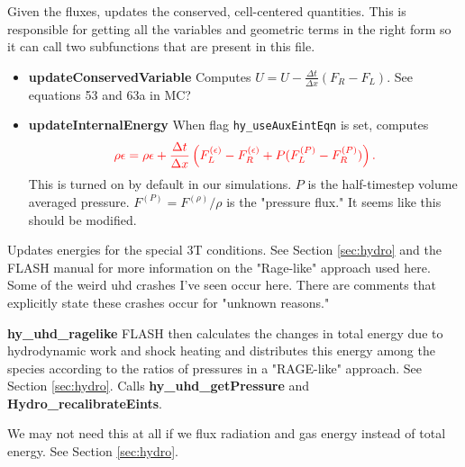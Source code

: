\documentclass[preprint,11pt]{aastex}
\newcommand{\beq}{\begin{equation}}
\newcommand{\eeq}{\end{equation}}
\begin{document}
\begin{description}
\begin{description}
\begin{itemize}
\begin{enumerate}
			\end{enumerate}
		\end{itemize}
		\item[unsplitUpdate] Given the fluxes, updates the conserved, cell-centered quantities.  This is responsible for getting all the variables and geometric terms in the right form so it can call two subfunctions that are present in this file.
		\begin{itemize}
			\item \textbf{updateConservedVariable} Computes $U = U-\frac{\Delta t}{\Delta x}\left( F_R - F_L \right)$.  See equations 53 and 63a in MC?
			\item \textbf{updateInternalEnergy} When flag \verb!hy_useAuxEintEqn! is set, computes 
			\beq
			{\color{red}
			\rho \epsilon = \rho \epsilon + \frac{\Delta t}{\Delta x} \left( F_L^{(\epsilon)} - F_R^{(\epsilon)} + P (F_{L}^{(P)} - F_{R}^{(P)}) \right).  
			}
			\eeq
			This is turned on by default in our simulations.  $P$ is the half-timestep volume averaged pressure.  $F^{(P)} = F^{(\rho)}/\rho$ is the "pressure flux." {\color{blue} It seems like this should be modified.}  
		\end{itemize}
		{\color{red}\item[multiTemp/unsplitUpdateMultiTemp] Updates energies for the special 3T conditions.  See Section \ref{sec:hydro} and the FLASH manual for more information on the "Rage-like" approach used here.  Some of the weird uhd crashes I've seen occur here.  There are comments that explicitly state these crashes occur for "unknown reasons."}
		\begin{itemize}
			{\color{red} \item \textbf{hy\_uhd\_ragelike} FLASH then calculates the changes in total energy due to hydrodynamic work and shock heating and distributes this energy among the species according to the ratios of pressures in a "RAGE-like" approach.  See Section \ref{sec:hydro}.  Calls \textbf{hy\_uhd\_getPressure} and \textbf{Hydro\_recalibrateEints}.} {\color{blue} We may not need this at all if we flux radiation and gas energy instead of total energy.  See Section \ref{sec:hydro}.}
		\end{itemize}
		

\end{description}
\end{description}
\end{document}
